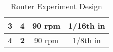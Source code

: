 \begin{table}[]
\begin{tabular}{rc|c|c|c|c|}
		\multicolumn{1}{|r|}{\textbf{3}}                                                & \textbf{4}                                                   & \multicolumn{2}{c|}{90 rpm}                                                                      & \multicolumn{2}{c|}{1/16th in}                                                     \\ \hline
		\multicolumn{1}{|r|}{\textbf{4}}                                                & \textbf{2}                                                   & \multicolumn{2}{c|}{90 rpm}                                                                      & \multicolumn{2}{c|}{1/8th in}                                                      \\ \hline
	\end{tabular}\caption{Router Experiment Design}\label{RoutDes}
\end{table}







